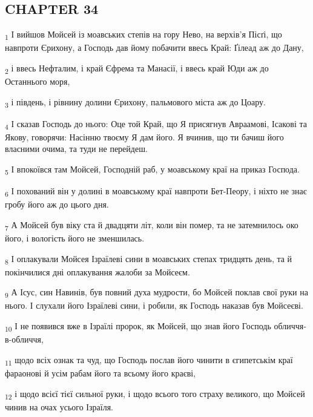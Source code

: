 \subsection{CHAPTER 34}
\begin{tcolorbox}
\textsubscript{1} І вийшов Мойсей із моавських степів на гору Нево, на верхів'я Пісґі, що навпроти Єрихону, а Господь дав йому побачити ввесь Край: Ґілеад аж до Дану,
\end{tcolorbox}
\begin{tcolorbox}
\textsubscript{2} і ввесь Нефталим, і край Єфрема та Манасії, і ввесь край Юди аж до Останнього моря,
\end{tcolorbox}
\begin{tcolorbox}
\textsubscript{3} і південь, і рівнину долини Єрихону, пальмового міста аж до Цоару.
\end{tcolorbox}
\begin{tcolorbox}
\textsubscript{4} І сказав Господь до нього: Оце той Край, що Я присягнув Авраамові, Ісакові та Якову, говорячи: Насінню твоєму Я дам його. Я вчинив, що ти бачиш його власними очима, та туди не перейдеш.
\end{tcolorbox}
\begin{tcolorbox}
\textsubscript{5} І впокоївся там Мойсей, Господній раб, у моавському краї на приказ Господа.
\end{tcolorbox}
\begin{tcolorbox}
\textsubscript{6} І похований він у долині в моавському краї навпроти Бет-Пеору, і ніхто не знає гробу його аж до цього дня.
\end{tcolorbox}
\begin{tcolorbox}
\textsubscript{7} А Мойсей був віку ста й двадцяти літ, коли він помер, та не затемнилось око його, і вологість його не зменшилась.
\end{tcolorbox}
\begin{tcolorbox}
\textsubscript{8} І оплакували Мойсея Ізраїлеві сини в моавських степах тридцять день, та й покінчилися дні оплакування жалоби за Мойсеєм.
\end{tcolorbox}
\begin{tcolorbox}
\textsubscript{9} А Ісус, син Навинів, був повний духа мудрости, бо Мойсей поклав свої руки на нього. І слухали його Ізраїлеві сини, і робили, як Господь наказав був Мойсеєві.
\end{tcolorbox}
\begin{tcolorbox}
\textsubscript{10} І не появився вже в Ізраїлі пророк, як Мойсей, що знав його Господь обличчя-в-обличчя,
\end{tcolorbox}
\begin{tcolorbox}
\textsubscript{11} щодо всіх ознак та чуд, що Господь послав його чинити в єгипетськім краї фараонові й усім рабам його та всьому його краєві,
\end{tcolorbox}
\begin{tcolorbox}
\textsubscript{12} і щодо всієї тієї сильної руки, і щодо всього того страху великого, що Мойсей чинив на очах усього Ізраїля.
\end{tcolorbox}
